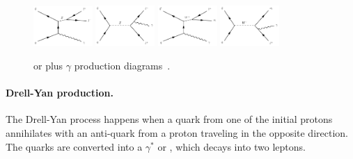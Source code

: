 \begin{figure}[h!]
\centering
  \includegraphics[width=0.2\textwidth]{Figures/c4/dia/40000101.pdf}
  \includegraphics[width=0.2\textwidth]{Figures/c4/dia/40000104.pdf}
  \includegraphics[width=0.2\textwidth]{Figures/c4/dia/40000111.pdf}
  \includegraphics[width=0.2\textwidth]{Figures/c4/dia/40000114.pdf}
  \caption{\PW or \PZ plus $\gamma$ production diagrams~\cite{diagram}.}
  \label{fig:c43}
\end{figure}

\paragraph{Drell-Yan production.}\label{sec:c4dy}
The Drell-Yan process happens when a quark from one of the initial
protons annihilates with an anti-quark from a proton traveling in the
opposite direction. The quarks are converted into a $\gamma^{*}$ or
\PZ, which decays into two leptons.

